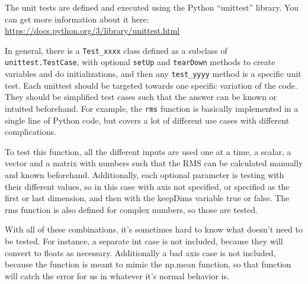 \documentclass[12pt]{article}
\begin{document}
The unit tests are defined and executed using the Python ``unittest'' library.  You can get more information about it here: \url{https://docs.python.org/3/library/unittest.html}

In general, there is a \texttt{Test\_xxxx} class defined as a subclass of \texttt{unittest.TestCase}, with optional \texttt{setUp} and \texttt{tearDown} methods to create variables and do initializations, and then any \texttt{test\_yyyy} method is a specific unit test.  Each unittest should be targeted towards one specific variation of the code.  They should be simplified test cases such that the answer can be known or intuited beforehand.  For example, the \texttt{rms} function is basically implemented in a single line of Python code, but covers a lot of different use cases with different complications.

To test this function, all the different inputs are used one at a time, a scalar, a vector and a matrix with numbers such that the RMS can be calculated manually and known beforehand.  Additionally, each optional parameter is testing with their different values, so in this case with axis not specified, or specified as the first or last dimension, and then with the keepDims variable true or false.  The rms function is also defined for complex numbers, so those are tested.

With all of these combinations, it's sometimes hard to know what doesn't need to be tested.  For instance, a separate int case is not included, because they will convert to floats as necessary.  Additionally a bad axis case is not included, because the function is meant to mimic the np.mean function, so that function will catch the error for us in whatever it's normal behavior is.
\end{document}
